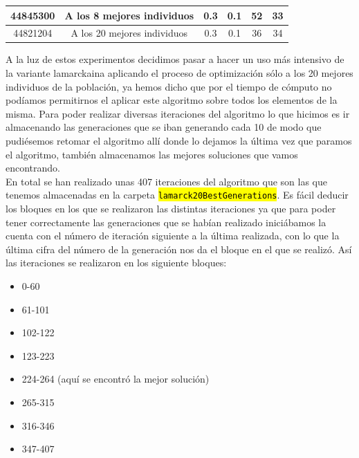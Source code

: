 \documentclass[10pt,a4paper]{article}
\newcommand{\archive}[1]{\sethlcolor{light-green}\hl{\texttt{#1}}} %
\begin{document}
\begin{center}
\begin{table}[H]
\begin{tabular}{|l|c|c|c|c|c|}
\multicolumn{1}{|c|}{44845300} & A los 8 mejores individuos  & 0.3                                                            & 0.1                                                               & 52                                                                          & 33                                                                                  \\ \hline
\multicolumn{1}{|c|}{44821204} & A los 20 mejores individuos & 0.3                                                            & 0.1                                                               & 36                                                                          & 34                                                                                  \\ \hline
\end{tabular}
\end{table}
\end{center}

A la luz de estos experimentos decidimos pasar a hacer un uso más intensivo de la variante lamarckaina aplicando el proceso de optimización sólo a los 20 mejores individuos de la población, ya hemos dicho que por el tiempo de cómputo no podíamos permitirnos el aplicar este algoritmo sobre todos los elementos de la misma. Para poder realizar diversas iteraciones del algoritmo lo que hicimos es ir almacenando las generaciones que se iban generando cada 10 de modo que pudiésemos retomar el algoritmo allí donde lo dejamos la última vez que paramos el algoritmo, también almacenamos las mejores soluciones que vamos encontrando.\\

En total se han realizado unas 407 iteraciones del algoritmo que son las que tenemos almacenadas en la carpeta \archive{lamarck20BestGenerations}. Es fácil deducir los bloques en los que se realizaron las distintas iteraciones ya que para poder tener correctamente las generaciones que se habían realizado iniciábamos la cuenta con el número de iteración siguiente a la última realizada, con lo que la última cifra del número de la generación nos da el bloque en el que se realizó. Así las iteraciones se realizaron en los siguiente bloques:

\begin{itemize}
\item 0-60
\item 61-101
\item 102-122
\item 123-223
\item 224-264 (aquí se encontró la mejor solución)
\item 265-315
\item 316-346
\item 347-407
\end{itemize}
\end{document}
